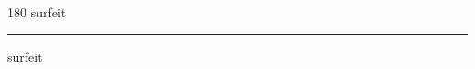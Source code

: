 
\begin{frame}
\begin{center}
\begin{turn}{180}
{\fontsize{2.5cm}{1em}\selectfont surfeit}
\end{turn}
\vspace{1em}\par  
\hrule
\vspace{1em}\par  
{\fontsize{2.5cm}{1em}\selectfont surfeit}
\end{center}
\end{frame}
